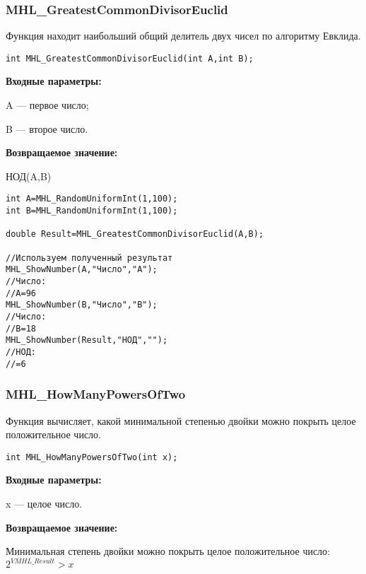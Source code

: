 \documentclass[a4paper,12pt]{article}
\begin{document}
\subsubsection{MHL\_GreatestCommonDivisorEuclid}\label{MHL_GreatestCommonDivisorEuclid}

Функция находит наибольший общий делитель двух чисел по алгоритму Евклида.


\begin{lstlisting}[label=code_syntax_MHL_GreatestCommonDivisorEuclid,caption=Синтаксис]
int MHL_GreatestCommonDivisorEuclid(int A,int B);
\end{lstlisting}

\textbf{Входные параметры:}  
 
A --- первое число;
 
B --- второе число.

\textbf{Возвращаемое значение:}
 
НОД(A,B)


\begin{lstlisting}[label=code_use_MHL_GreatestCommonDivisorEuclid,caption=Пример использования]
int A=MHL_RandomUniformInt(1,100);
int B=MHL_RandomUniformInt(1,100);

double Result=MHL_GreatestCommonDivisorEuclid(A,B);

//Используем полученный результат
MHL_ShowNumber(A,"Число","A");
//Число:
//A=96
MHL_ShowNumber(B,"Число","B");
//Число:
//B=18
MHL_ShowNumber(Result,"НОД","");
//НОД:
//=6
\end{lstlisting}

\subsubsection{MHL\_HowManyPowersOfTwo}\label{MHL_HowManyPowersOfTwo}

Функция вычисляет, какой минимальной степенью двойки можно покрыть целое положительное число.


\begin{lstlisting}[label=code_syntax_MHL_HowManyPowersOfTwo,caption=Синтаксис]
int MHL_HowManyPowersOfTwo(int x);
\end{lstlisting}

\textbf{Входные параметры:}  
 
x --- целое число.

\textbf{Возвращаемое значение:}
 
 Минимальная степень двойки можно покрыть целое положительное число: $2^{VMHL\_Result}>x$
\end{document}
